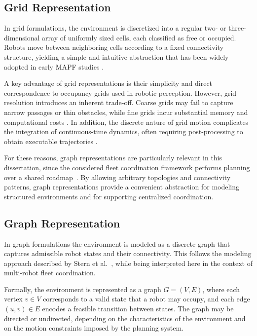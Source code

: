 \subsection{Grid Representation}
\label{subsec:grid_representation}
\hspace{\parindent}
In grid formulations, the environment is discretized into a regular two- or three-dimensional array
of uniformly sized cells, each classified as free or occupied. Robots move between neighboring
cells according to a fixed connectivity structure, yielding a simple and intuitive abstraction that
has been widely adopted in early MAPF studies
\cite{stern2019definitions}.

A key advantage of grid representations is their simplicity and direct correspondence to occupancy
grids used in robotic perception. However, grid resolution introduces an inherent trade-off. Coarse
grids may fail to capture narrow passages or thin obstacles, while fine grids incur substantial memory
and computational costs \cite{yang2010grid,ma2022graph}. In addition, the discrete nature of grid
motion complicates the integration of continuous-time dynamics, often requiring post-processing to
obtain executable trajectories \cite{ma2022graph}.

For these reasons, graph representations are particularly relevant in this dissertation, since the
considered fleet coordination framework performs planning over a shared roadmap~\cite{matos2025criis}. By allowing
arbitrary topologies and connectivity patterns, graph representations provide a convenient
abstraction for modeling structured environments and for supporting centralized coordination.


\subsection{Graph Representation}
\hspace{\parindent}
In graph formulations the environment is modeled as a discrete graph that
captures admissible robot states and their connectivity. This follows the modeling approach
described by Stern et al.~\cite{stern2019definitions}, while being interpreted here in the context of
multi-robot fleet coordination.

Formally, the environment is represented as a graph \(G = (V, E)\), where each vertex
\(v \in V\) corresponds to a valid state that a robot may occupy, and each edge \((u,v) \in E\)
encodes a feasible transition between states. The graph may be directed or undirected, depending on
the characteristics of the environment and on the motion constraints imposed by the planning system.

